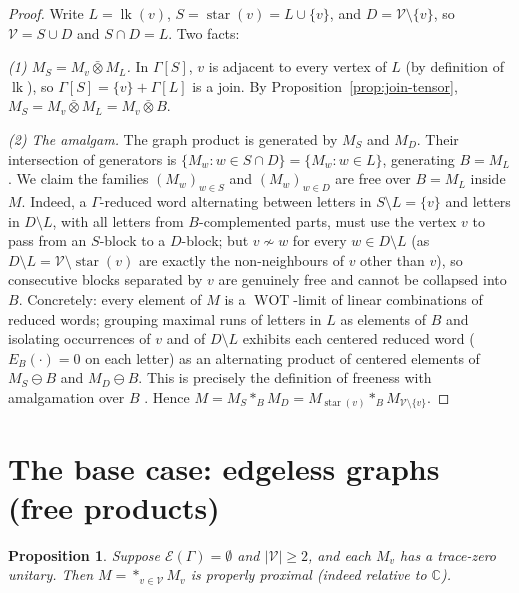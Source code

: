 \documentclass[11pt]{article}
\newtheorem{proposition}{Proposition}
\DeclareMathOperator{\link}{lk}
\DeclareMathOperator{\str}{star}
\DeclareMathOperator{\WOT}{WOT}
\newcommand{\Gra}{\Gamma}
\newcommand{\VV}{\mathcal V}
\newcommand{\EE}{\mathcal E}
\newcommand{\abs}[1]{\lvert #1\rvert}
\newcommand{\set}[1]{\{#1\}}
\begin{document}
\begin{proof}
Write $L=\link(v)$, $S=\str(v)=L\cup\set v$, and $D=\VV\setminus\set v$, so $\VV=S\cup D$ and
$S\cap D=L$. Two facts:

\emph{(1) $M_S=M_v\bar\otimes M_L$.} In $\Gra[S]$, $v$ is adjacent to every vertex of $L$ (by definition of
$\link$), so $\Gra[S]=\set v + \Gra[L]$ is a join. By Proposition~\ref{prop:join-tensor},
$M_S=M_v\bar\otimes M_L=M_v\bar\otimes B$.

\emph{(2) The amalgam.} The graph product is generated by $M_S$ and $M_D$. Their intersection of generators
is $\set{M_w:w\in S\cap D}=\set{M_w:w\in L}$, generating $B=M_L$. We claim the families
$(M_w)_{w\in S}$ and $(M_w)_{w\in D}$ are free over $B=M_L$ inside $M$. Indeed, a $\Gra$-reduced word
alternating between letters in $S\setminus L=\set v$ and letters in $D\setminus L$, with all letters from
$B$-complemented parts, must use the vertex $v$ to pass from an $S$-block to a $D$-block; but
$v\not\sim w$ for every $w\in D\setminus L$ (as $D\setminus L=\VV\setminus\str(v)$ are exactly the
non-neighbours of $v$ other than $v$), so consecutive blocks separated by $v$ are genuinely free and cannot
be collapsed into $B$. Concretely: every element of $M$ is a $\WOT$-limit of linear combinations of reduced
words; grouping maximal runs of letters in $L$ as elements of $B$ and isolating occurrences of $v$ and of
$D\setminus L$ exhibits each centered reduced word ($E_B(\cdot)=0$ on each letter) as an alternating product
of centered elements of $M_S\ominus B$ and $M_D\ominus B$. This is precisely the definition of freeness with
amalgamation over $B$ \cite{CFG}. Hence $M=M_S*_B M_D=M_{\str(v)}*_B M_{\VV\setminus\set v}$.
\end{proof}

\section{The base case: edgeless graphs (free products)}\label{sec:base}

\begin{proposition}\label{prop:base}
Suppose $\EE(\Gra)=\emptyset$ and $\abs{\VV}\ge 2$, and each $M_v$ has a trace-zero unitary. Then
$M=\ast_{v\in\VV}M_v$ is properly proximal (indeed relative to $\mathbb C$).
\end{proposition}
\end{document}

